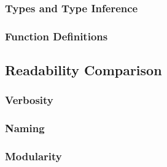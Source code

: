 \subsubsection{Types and Type Inference}

\subsubsection{Function Definitions}


\subsection{Readability Comparison}

\subsubsection{Verbosity}

\subsubsection{Naming}

\subsubsection{Modularity}

